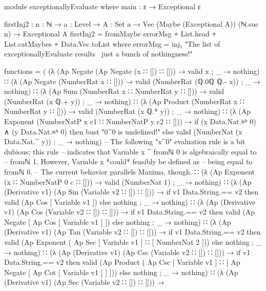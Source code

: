 \documentclass{report}
\begin{document}
\begin{code}
module exceptionallyEvaluate where
  main : ε → Exceptional ε

  firstInj2 : {n : ℕ} → {a : Level} → {A : Set a} →
              Vec (Maybe (Exceptional A)) (ℕ.suc n) → Exceptional A
  firstInj2 = fromMaybe errorMsg ∘ List.head ∘ List.catMaybes
            ∘ Data.Vec.toList
    where errorMsg = inj₁ "The list of exceptionallyEvaluate results \
                          \was just a bunch of nothingness!"

  functions =
    ( (λ { (Ap Negate (Ap Negate (x ∷ []) ∷ [])) → valid x
         ; _ → nothing})
    ∷ (λ { (Ap Negate (NumberRat x ∷ [])) → valid (NumberRat (ℚ.0ℚ ℚ.- x))
         ; _ → nothing})
    ∷ (λ { (Ap Sum (NumberRat x ∷ NumberRat y ∷ [])) →
           valid (NumberRat (x ℚ.+ y))
         ; _ → nothing})
    ∷ (λ { (Ap Product (NumberRat x ∷ NumberRat y ∷ [])) →
           valid (NumberRat (x ℚ.* y))
         ; _ → nothing})
    ∷ (λ { (Ap Exponent (NumberNatP x c1 ∷ NumberNatP y c2 ∷ [])) →
           if (x Data.Nat.≡ᵇ 0) ∧ (y Data.Nat.≡ᵇ 0)
             then bust "0^0 is undefined!"
             else valid (NumberNat (x Data.Nat.^ y))
         ; _ → nothing})
    -- The following "x^0" evaluation rule is a bit dubious; this rule
    -- indicates that Variable x ^ fromℕ 0 is algebraically equal to
    -- fromℕ 1.  However, Variable x *could* feasibly be defined as
    -- being equal to fromℕ 0.
    -- The current behavior parallels Maxima, though.
    ∷ (λ { (Ap Exponent (x ∷ NumberNatP 0 c ∷ [])) → valid (NumberNat 1)
         ; _ → nothing})
    ∷ (λ { (Ap (Derivative v1) (Ap Sin (Variable v2 ∷ []) ∷ [])) →
           if v1 Data.String.== v2
             then valid (Ap Cos [ Variable v1 ])
             else nothing
         ; _ → nothing})
    ∷ (λ { (Ap (Derivative v1) (Ap Cos (Variable v2 ∷ []) ∷ [])) →
           if v1 Data.String.== v2
             then valid (Ap Negate [ Ap Cos [ Variable v1 ] ])
             else nothing
         ; _ → nothing})
    ∷ (λ { (Ap (Derivative v1) (Ap Tan (Variable v2 ∷ []) ∷ [])) →
           if v1 Data.String.== v2
             then valid (Ap Exponent ( Ap Sec [ Variable v1 ] ∷ [ NumberNat 2 ]))
             else nothing
         ; _ → nothing})
    ∷ (λ { (Ap (Derivative v1) (Ap Csc (Variable v2 ∷ []) ∷ [])) →
           if v1 Data.String.== v2
             then valid (Ap Product
                            ( Ap Csc [ Variable v1 ]
                            ∷ [ Ap Negate [ Ap Cot [ Variable v1 ] ] ]))
             else nothing
         ; _ → nothing})
    ∷ (λ { (Ap (Derivative v1) (Ap Sec (Variable v2 ∷ []) ∷ [])) →
}
\end{code}
\end{document}
